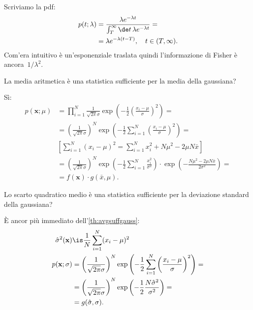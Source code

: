 \begin{solution}
	Scriviamo la pdf:
	\begin{align*}
		p(t;\lambda)
		&= \frac {\lambda e^{-\lambda t}} {\int_T^\infty \de t\, \lambda e^{-\lambda t}} = \\
		&= \lambda e^{-\lambda (t-T)}, \quad t\in(T,\infty).
	\end{align*}
	Com'era intuitivo è un'esponenziale traslata quindi l'informazione di Fisher è ancora~$1/\lambda^2$.
\end{solution}

\begin{exercise}
	\label{th:avgsuffgauss}
	La media aritmetica è una statistica sufficiente per la media della gaussiana?
\end{exercise}

\begin{solution*}
	Sì:
	\begin{align*}
		p(\mathbf x;\mu)
		&= \prod_{i=1}^N \frac1{\sqrt{2\pi}\sigma} 
		\exp \left( -\frac12 \left( \frac{x_i-\mu}\sigma \right)^2 \right) = \\
		&= \left( \frac1{\sqrt{2\pi}\sigma} \right)^N
		\exp \left( -\frac12 \sum_{i=1}^N \left( \frac{x_i-\mu}\sigma \right)^2 \right) = \\
		&\left[ \sum_{i=1}^N (x_i-\mu)^2
		= \sum_{i=1}^N x_i^2 + N\mu^2 - 2\mu N\bar x \right] \\
		&= \left( \frac1{\sqrt{2\pi}\sigma} \right)^N
		\exp \left( -\frac12 \sum_{i=1}^N \frac{x_i^2}{\sigma^2} \right)
		\cdot \exp \left( -\frac{N\mu^2-2\mu N\bar x}{2\sigma^2} \right) = \\
		&= f(\mathbf x) \cdot g(\bar x,\mu).
	\end{align*}
\end{solution*}

\begin{exercise}
	\label{th:rmssuffgauss}
	Lo scarto quadratico medio è una statistica sufficiente per la deviazione standard della gaussiana?
\end{exercise}

\begin{solution*}
	È ancor più immediato dell'\autoref{th:avgsuffgauss}:
	\begin{align*}
		\hat\sigma^2(\mathbf x)
		&\is \frac1N \sum_{i=1}^N (x_i-\mu)^2 \\
		p(\mathbf x;\sigma)
		&= \left( \frac1{\sqrt{2\pi}\sigma} \right)^N
		\exp \left( -\frac12 \sum_{i=1}^N \left( \frac{x_i-\mu}\sigma \right)^2 \right) = \\
		&= \left( \frac1{\sqrt{2\pi}\sigma} \right)^N
		\exp \left( -\frac12 \frac{N\hat\sigma^2}{\sigma^2} \right) = \\
		&= g(\hat\sigma,\sigma).
	\end{align*}
\end{solution*}

